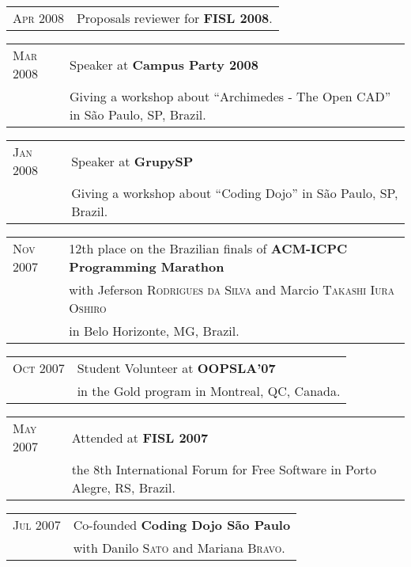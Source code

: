 \documentclass[letter,10pt]{article}
\begin{document}
\begin{tabular}{p{2.5cm}l}
  \textsc{Apr 2008} & Proposals reviewer for \textbf{FISL 2008}.\\
\end{tabular}

\begin{tabular}{p{2.5cm}l}
  \textsc{Mar 2008} & Speaker at \textbf{Campus Party 2008}\\
  &Giving a workshop about ``Archimedes - The Open CAD'' in São Paulo, SP, Brazil.\\
\end{tabular}

\begin{tabular}{p{2.5cm}l}
  \textsc{Jan 2008} & Speaker at \textbf{GrupySP}\\
  &Giving a workshop about ``Coding Dojo'' in São Paulo, SP, Brazil.\\
\end{tabular}

\begin{tabular}{p{2.5cm}l}
  \textsc{Nov 2007} & 12th place on the Brazilian finals of \textbf{ACM-ICPC
    Programming Marathon}\\
  & with Jeferson \textsc{Rodrigues da Silva} and Marcio
  \textsc{Takashi Iura Oshiro}\\
  & in Belo Horizonte, MG, Brazil.\\
\end{tabular}

\begin{tabular}{p{2.5cm}l}
  \textsc{Oct 2007} & Student Volunteer at \textbf{OOPSLA'07}\\
  & in the Gold program in Montreal, QC, Canada.\\
\end{tabular}

\begin{tabular}{p{2.5cm}l}
  \textsc{May 2007} & Attended at \textbf{FISL 2007}\\
  & the 8th International Forum for Free Software in Porto
  Alegre, RS, Brazil.\\
\end{tabular}

\begin{tabular}{p{2.5cm}l}
  \textsc{Jul 2007} & Co-founded \textbf{Coding Dojo São Paulo}\\
  & with Danilo \textsc{Sato} and Mariana \textsc{Bravo}.\\
\end{tabular}
\end{document}
